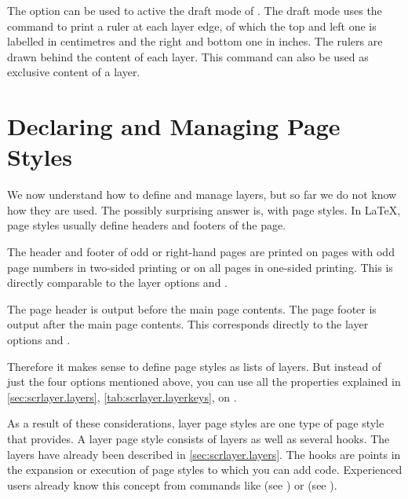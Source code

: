 \begin{Declaration}
\end{Declaration}
The \KOMAScript{} option  can be used to active the draft mode
of . The draft mode uses the 
command to print a ruler at each layer edge, of which the top and left one is
labelled in centimetres and the right and bottom one in inches. The rulers are
drawn behind the content of each layer. This command can also be used as
exclusive content of a layer.%
\EndIndexGroup


\section{Declaring and Managing Page Styles}

\BeginIndexGroup
{}%
We now understand how to define and manage layers, but so far we do not know
how they are used. The possibly surprising answer is, with page styles. In
\LaTeX{}, page styles usually define headers and footers of the page.

The header and footer of odd or right-hand pages
are printed on pages with odd page numbers in two-sided printing or on all
pages in one-sided printing. This is directly comparable to the layer
options  and
.

The page header is output before the main page
contents. The page footer is output after the main page contents. This
corresponds directly to the layer
options
 and .

Therefore it makes sense to define page styles as lists of layers. But instead
of just the four options mentioned above, you can use all the properties
explained in \autoref{sec:scrlayer.layers}, \autoref{tab:scrlayer.layerkeys},
on .

As a result of these considerations, layer page
styles%
 are one type of page style that
 provides. A layer page style consists of layers as well as
several hooks. The layers have already been described in
\autoref{sec:scrlayer.layers}. The hooks%
 are points in the expansion or execution of page styles to
which you can add code. Experienced users already know this concept from
commands like  (see \cite{latex:usrguide}) or
 (see
).

